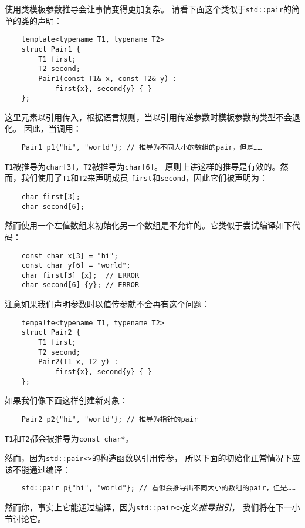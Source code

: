 使用类模板参数推导会让事情变得更加复杂。
请看下面这个类似于\texttt{std::pair}的简单的类的声明：
\begin{lstlisting}
    template<typename T1, typename T2>
    struct Pair1 {
        T1 first;
        T2 second;
        Pair1(const T1& x, const T2& y) :
            first{x}, second{y} { }
    };
\end{lstlisting}
这里元素以引用传入，根据语言规则，当以引用传递参数时模板参数的类型不会退化。
因此，当调用：
\begin{lstlisting}
    Pair1 p1{"hi", "world"}; // 推导为不同大小的数组的pair，但是……
\end{lstlisting}
\texttt{T1}被推导为\texttt{char[3]}，\texttt{T2}被推导为\texttt{char[6]}。
原则上讲这样的推导是有效的。然而，我们使用了\texttt{T1}和\texttt{T2}来声明成员
\texttt{first}和\texttt{second}，因此它们被声明为：
\begin{lstlisting}
    char first[3];
    char second[6];
\end{lstlisting}
然而使用一个左值数组来初始化另一个数组是不允许的。它类似于尝试编译如下代码：
\begin{lstlisting}
    const char x[3] = "hi";
    const char y[6] = "world";
    char first[3] {x};  // ERROR
    char second[6] {y}; // ERROR
\end{lstlisting}
注意如果我们声明参数时以值传参就不会再有这个问题：
\begin{lstlisting}
    tempalte<typename T1, typename T2>
    struct Pair2 {
        T1 first;
        T2 second;
        Pair2(T1 x, T2 y) :
            first{x}, second{y} { }
    };
\end{lstlisting}
如果我们像下面这样创建新对象：
\begin{lstlisting}
    Pair2 p2{"hi", "world"}; // 推导为指针的pair
\end{lstlisting}
\texttt{T1}和\texttt{T2}都会被推导为\texttt{const char*}。

然而，因为\texttt{std::pair<>}的构造函数以引用传参，
所以下面的初始化正常情况下应该不能通过编译：
\begin{lstlisting}
    std::pair p{"hi", "world"}; // 看似会推导出不同大小的数组的pair，但是……
\end{lstlisting}
然而你，事实上它能通过编译，因为\texttt{std::pair<>}定义\emph{推导指引}，
我们将在下一小节讨论它。

